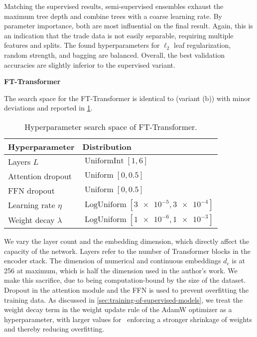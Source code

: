 Matching the supervised results, semi-supervised ensembles exhaust the maximum tree depth and combine trees with a coarse learning rate. By parameter importance, both are most influential on the final result. Again, this is an indication that the trade data is not easily separable, requiring multiple features and splits. The found hyperparameters for $\ell_2$ leaf regularization, random strength, and bagging are balanced. Overall, the best validation accuracies are slightly inferior to the supervised variant.

\clearpage

\textbf{FT-Transformer}

The search space for the FT-Transformer is identical to \textcite[\checkmark][18950]{gorishniyRevisitingDeepLearning2021} (variant (b)) with minor deviations and reported in \cref{tab:hyperparameter-space-2}.

\begin{table}[!h]
    \centering
    \caption[Hyperparameter Search Space of FT-Transformer]{Hyperparameter search space of FT-Transformer.}
    \label{tab:hyperparameter-space-2}
    \begin{tabular}{@{}ll@{}}
        \toprule
        Hyperparameter         & Distribution                                        \\ \midrule
        Layers $L$             & $\operatorname{UniformInt}[1,6]$                    \\
        Attention dropout      & $\operatorname{Uniform}[0, 0.5]$                    \\
        \gls{FFN} dropout      & $\operatorname{Uniform}[0, 0.5]$                    \\
        Learning rate $\eta$   & $\operatorname{LogUniform}[\num{3e-5}, \num{3e-4}]$ \\
        Weight decay $\lambda$ & $\operatorname{LogUniform}[\num{1e-6}, \num{1e-3}]$ \\ \bottomrule
    \end{tabular}
\end{table}

We vary the layer count and the embedding dimension, which directly affect the capacity of the network. Layers refer to the number of Transformer blocks in the encoder stack. The dimension of numerical and continuous embeddings $d_e$ is at \num{256} at maximum, which is half the dimension used in the author's work. We make this sacrifice, due to being computation-bound by the size of the dataset. Dropout in the attention module and the \gls{FFN} is used to prevent overfitting the training data. As discussed in \cref{sec:training-of-supervised-models}, we treat the weight decay term in the weight update rule of the AdamW optimizer as a hyperparameter, with larger values for \lambda~enforcing a stronger shrinkage of weights and thereby reducing overfitting.

